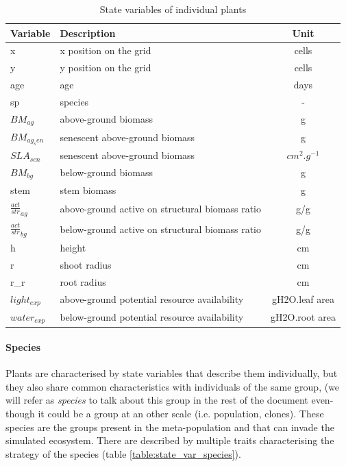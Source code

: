 \begin{table}
\caption{State variables of individual plants} 
\label{table:state_var_plant}
\begin{tabular}{l|l|c}
Variable & Description & Unit \\ 
\hline 
x & x position on the grid & cells \\
y & y position on the grid & cells \\
age & age & days \\
sp & species & - \\
$BM_{ag}$ & above-ground biomass & g \\
$BM_{ag_sen}$ & senescent above-ground biomass & g \\
$SLA_{sen}$ & senescent above-ground biomass & $cm^{2}.g^{-1}$ \\
$BM_{bg}$ & below-ground biomass & g \\
stem & stem biomass & g \\
$\frac{act}{str}_{ag}$ & above-ground active on structural biomass ratio & g/g \\
$\frac{act}{str}_{bg}$ & below-ground active on structural biomass ratio & g/g \\
h & height & cm \\
r & shoot radius & cm \\
r\_r & root radius & cm \\ 
$light_{exp}$ & above-ground potential resource availability & gH2O.leaf area\\
$water_{exp}$ & below-ground potential resource availability & gH2O.root area\\
\end{tabular} 
\vspace*{0.5cm}
\end{table}


\paragraph{Species} Plants are characterised by state variables that describe them individually, but they also share common characteristics with individuals of the same group, (we will refer as \textit{species} to talk about this group in the rest of the document even-though it could be a group at an other scale (i.e. population, clones). These species are the groups present in the meta-population and that can invade the simulated ecosystem. There are described by multiple traits characterising the strategy of the species (table \ref{table:state_var_species}).


